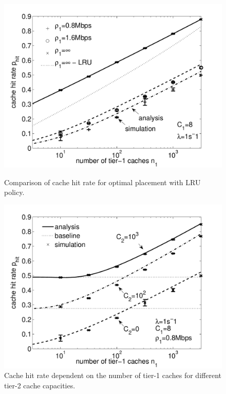 \begin{figure}[bt]
\begin{minipage}[b]{0.32\textwidth}
  \centering
  \includegraphics[width=1.06\textwidth]{hierarchical/analyticbw/figures/hwc_CISP0}
  \caption{Comparison of cache hit rate for optimal placement with LRU policy.}
  \label{fig:hwc_CISP0}
\end{minipage}
\hspace{0.01\textwidth}
\begin{minipage}[b]{0.32\textwidth}
  \centering
  \includegraphics[width=1.05\textwidth]{hierarchical/analyticbw/figures/hwc_l1C8_C2}
  \caption{Cache hit rate dependent on the number of tier-1 caches for different tier-2 cache capacities.}

\end{minipage}
\end{figure}
